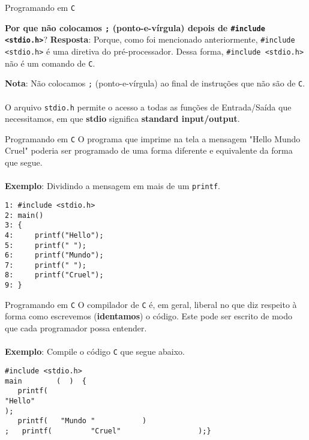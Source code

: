 \documentclass{beamer}
\newcommand{\C}{\texttt{C}}
\begin{document}
\begin{frame}{Programando em \C}
\begin{block}{\textbf{Por que não colocamos \texttt{;} (ponto-e-vírgula) depois de \texttt{\#include <stdio.h>}}?}
\textbf{Resposta}: Porque, como foi mencionado anteriormente, \texttt{\#include <stdio.h>} é uma diretiva do pré-processador. Dessa forma, \texttt{\#include <stdio.h>} não é um comando de \C.
\end{block}
\vspace{0.3cm}
\textbf{Nota}: Não colocamos \texttt{;} (ponto-e-vírgula) ao final de instruções que não são de \C.\\~\\

O arquivo \texttt{stdio.h} permite o acesso a todas as funções de Entrada/Saída que necessitamos, em que \textbf{stdio} significa \textbf{standard input/output}.
\end{frame}

\begin{frame}[fragile]{Programando em \C}
O programa que imprime na tela a mensagem "Hello Mundo Cruel" poderia ser programado de uma forma diferente e equivalente da forma que segue.\\~\\

\textbf{Exemplo}: Dividindo a mensagem em mais de um \texttt{printf}.

\begin{verbatim}
1: #include <stdio.h>
2: main()
3: {
4:     printf("Hello");
5:     printf(" ");
6:     printf("Mundo");
7:     printf(" ");
8:     printf("Cruel");
9: }
\end{verbatim}
\end{frame}

\begin{frame}[fragile]{Programando em \C}
O compilador de \texttt{C} é, em geral, liberal no que diz respeito à forma como escrevemos (\textbf{identamos}) o código. Este pode ser escrito de modo que cada programador possa entender.\\~\\

\pause \textbf{Exemplo}: Compile o código \texttt{C} que segue abaixo.

\begin{verbatim}
#include <stdio.h>
main        (  )  {
   printf(
"Hello"
);
   printf(   "Mundo "           )
;   printf(         "Cruel"                  );}
\end{verbatim}
\end{frame}
\end{document}
